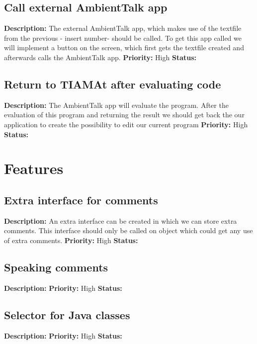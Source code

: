 \documentclass{article}
\begin{document}
\subsection{Call external AmbientTalk app}
\textbf{Description: }The external AmbientTalk app, which makes use of the textfile from the previous - insert number- should be called. To get this app called we will implement
a button on the screen, which first gets the textfile created and afterwards calls the AmbientTalk app. \newline
\textbf{Priority:} High \newline
\textbf{Status: } \newline
\subsection{Return to TIAMAt after evaluating code}
\textbf{Description: } The AmbientTalk app will evaluate the program. After the evaluation of this program and returning the result we should get back the our application to
create the possibility to edit our current program\newline
\textbf{Priority:} High \newline
\textbf{Status: } \newline
\section{Features}
\subsection{Extra interface for comments}
\textbf{Description: } An extra interface can be created in which we can store extra comments. This interface should only be called on object which could get any use of extra comments.
 \newline
\textbf{Priority:} High \newline
\textbf{Status: } \newline
\subsection{Speaking comments}
\textbf{Description: } \newline
\textbf{Priority:} High \newline
\textbf{Status: } \newline
\subsection{Selector for Java classes}
\textbf{Description: } \newline
\textbf{Priority:} High \newline
\textbf{Status: } \newline
\end{document}
